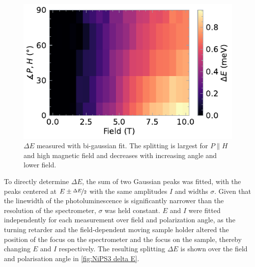 \documentclass[
	twoside,
	parskip=half,
	a4paper,
]{scrbook}
\begin{document}
\begin{figure}
	\centering
	\includegraphics{../figures/2024-04-21 NiPS3 DeltaE.pdf}
	\caption{$\Delta E$ measured with bi-gaussian fit. The splitting is largest for $P\parallel H$ and high magnetic field and decreases with increasing angle and lower field.}
	\label{fig:NiPS3 delta E}
\end{figure}
To directly determine $\Delta E$, the sum of two Gaussian peaks was fitted, with the peaks centered at $E\pm \nicefrac{\Delta E}{2}$ with the same amplitudes $I$ and widths $\sigma$.
Given that the linewidth of the photoluminescence is significantly narrower \cite{NiPS3_magnon_gap} than the resolution of the spectrometer, $\sigma$ was held constant.
$E$ and $I$ were fitted independently for each measurement over field and polarization angle, as the turning retarder and the field-dependent moving sample holder altered the position of the focus on the spectrometer and the focus on the sample, thereby changing $E$ and $I$ respectively.
The resulting splitting $\Delta E$ is shown over the field and polarisation angle in \autoref{fig:NiPS3 delta E}.
\end{document}
